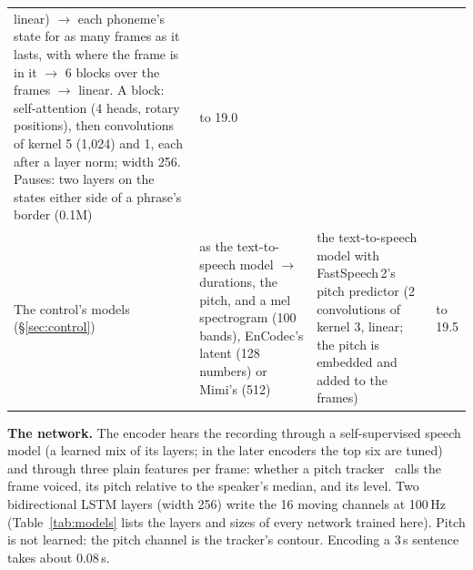 \documentclass[10pt,a4paper,twocolumn]{article}
\begin{document}
\begin{table}[t]
\begin{tabular}{@{}>{\raggedright\arraybackslash}p{20mm}>{\raggedright\arraybackslash}p{56mm}>{\raggedright\arraybackslash}p{74mm}>{\raggedright\arraybackslash}p{17mm}@{}}
linear) $\rightarrow$ each phoneme's state for as many frames as it lasts, with where the frame is
in it $\rightarrow$ 6 blocks over the frames $\rightarrow$ linear. A block: self-attention (4
heads, rotary positions), then convolutions of kernel 5 (1,024) and 1, each after a layer norm;
width 256. Pauses: two layers on the states either side of a phrase's border (0.1M)
& 18.9 to 19.0\\
\addlinespace[2pt]
The control's models (\S\ref{sec:control})
& as the text-to-speech model $\rightarrow$ durations, the pitch, and a mel spectrogram (100
bands), EnCodec's latent (128 numbers) or Mimi's (512)
& the text-to-speech model with FastSpeech\,2's pitch predictor (2 convolutions of kernel 3,
linear; the pitch is embedded and added to the frames)
& 19.4 to 19.5\\
\bottomrule
\end{tabular}
\end{table}

\textbf{The network.} The encoder hears the recording through a self-supervised speech model (a
learned mix of its layers; in the later encoders the top six are tuned) and through three plain
features per frame: whether a pitch tracker~\cite{praat} calls the frame voiced, its pitch relative to the
speaker's median, and its level. Two bidirectional LSTM layers (width 256) write the 16 moving
channels at 100\,Hz (Table~\ref{tab:models} lists the layers and sizes of every network trained
here). Pitch is not learned: the pitch channel is the tracker's contour. Encoding a
3\,s sentence takes about 0.08\,s.
\end{document}
